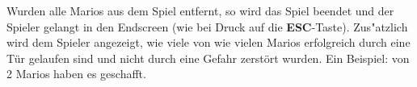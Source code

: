 Wurden alle Marios aus dem Spiel entfernt, so wird das Spiel beendet und der Spieler gelangt in den Endscreen (wie bei Druck auf die \textbf{ESC}-Taste). 
Zus"atzlich wird dem Spieler angezeigt, wie viele von wie vielen Marios erfolgreich durch eine Tür gelaufen sind und nicht durch eine Gefahr zerstört wurden. Ein Beispiel:  von 2 Marios haben es geschafft\grqq{}.